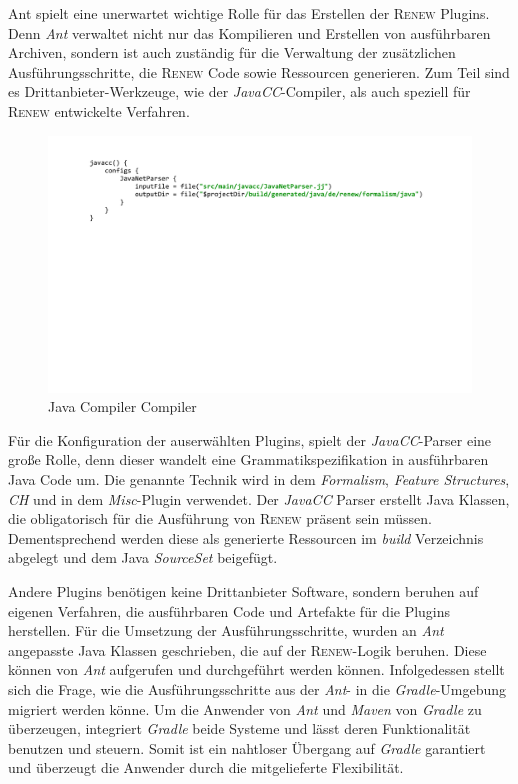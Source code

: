 	Ant spielt eine unerwartet wichtige Rolle für das Erstellen der \textsc{Renew} Plugins. Denn \textit{Ant} verwaltet nicht nur das Kompilieren und Erstellen von ausführbaren Archiven, sondern ist auch zuständig für die Verwaltung der zusätzlichen Ausführungsschritte, die \textsc{Renew} Code sowie Ressourcen generieren. Zum Teil sind es Drittanbieter-Werkzeuge, wie der \textit{JavaCC}-Compiler, als auch speziell für \textsc{Renew} entwickelte Verfahren. \bigbreak

	\begin{figure}[h!]
	  \centering
	  \includegraphics[width=\textwidth]{material/images/gradle/javacc.pdf}
	  \caption{Java Compiler Compiler}
	  \label{fig:javacc}
	\end{figure}

	Für die Konfiguration der auserwählten Plugins, spielt der \textit{JavaCC}-Parser eine große Rolle, denn dieser wandelt eine Grammatikspezifikation in ausführbaren Java Code um. Die genannte Technik wird in dem \textit{Formalism}, \textit{Feature Structures}, \textit{CH} und in dem \textit{Misc}-Plugin verwendet. Der \textit{JavaCC} Parser erstellt Java Klassen, die obligatorisch für die Ausführung von \textsc{Renew} präsent sein müssen. Dementsprechend werden diese als generierte Ressourcen im \textit{build} Verzeichnis abgelegt und dem Java \textit{SourceSet} beigefügt. \bigbreak

	Andere Plugins benötigen keine Drittanbieter Software, sondern beruhen auf eigenen Verfahren, die ausführbaren Code und Artefakte für die Plugins herstellen. Für die Umsetzung der Ausführungsschritte, wurden an \textit{Ant} angepasste Java Klassen geschrieben, die auf der \textsc{Renew}-Logik beruhen. Diese können von \textit{Ant} aufgerufen und durchgeführt werden können. Infolgedessen stellt sich die Frage, wie die Ausführungsschritte aus der \textit{Ant}- in die \textit{Gradle}-Umgebung migriert werden könne. \newline
	Um die Anwender von \textit{Ant} und \textit{Maven} von \textit{Gradle} zu überzeugen, integriert \textit{Gradle} beide Systeme und lässt deren Funktionalität benutzen und steuern. Somit ist ein nahtloser Übergang auf \textit{Gradle} garantiert und überzeugt die Anwender durch die mitgelieferte Flexibilität.\bigbreak
	

